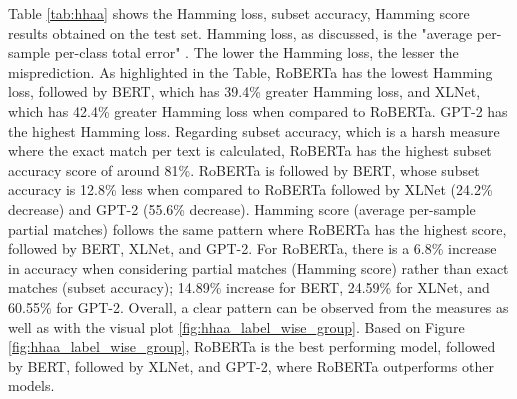Table \ref{tab:hhaa} shows the Hamming loss, subset accuracy, Hamming score results obtained on the test set. Hamming loss, as discussed, is the "average per-sample per-class total error" \cite{sokolova2009systematic}. The lower the Hamming loss, the lesser the misprediction. As highlighted in the Table, RoBERTa has the lowest Hamming loss, followed by BERT, which has 39.4\% greater Hamming loss, and XLNet, which has 42.4\% greater Hamming loss when compared to RoBERTa. GPT-2 has the highest Hamming loss. Regarding subset accuracy, which is a harsh measure where the exact match per text is calculated, RoBERTa has the highest subset accuracy score of around 81\%. RoBERTa is followed by BERT, whose subset accuracy is 12.8\% less when compared to RoBERTa followed by XLNet (24.2\% decrease) and GPT-2 (55.6\% decrease). Hamming score (average per-sample partial matches) follows the same pattern where RoBERTa has the highest score, followed by BERT, XLNet, and GPT-2. For RoBERTa, there is a 6.8\% increase in accuracy when considering partial matches (Hamming score) rather than exact matches (subset accuracy); 14.89\% increase for BERT, 24.59\% for XLNet, and 60.55\% for GPT-2.
Overall, a clear pattern can be observed from the measures as well as with the visual plot \ref{fig:hhaa_label_wise_group}. Based on Figure  \ref{fig:hhaa_label_wise_group}, RoBERTa is the best performing model, followed by BERT, followed by XLNet, and GPT-2, where RoBERTa outperforms other models.

